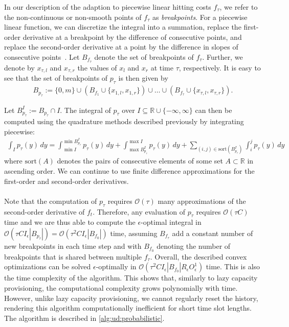In our description of the adaption to piecewise linear hitting costs $f_{\tau}$, we refer to the non-continuous or non-smooth points of $f_{\tau}$ as \emph{breakpoints}. For a piecewise linear function, we can discretize the integral into a summation, replace the first-order derivative at a breakpoint by the difference of consecutive points, and replace the second-order derivative at a point by the difference in slopes of consecutive points~\cite{Bansal2015}. Let $B_{f_{\tau}}$ denote the set of breakpoints of $f_{\tau}$. Further, we denote by $x_{\tau,l}$ and $x_{\tau,r}$ the values of $x_l$ and $x_r$ at time $\tau$, respectively. It is easy to see that the set of breakpoints of $p_{\tau}$ is then given by \begin{align*}
    B_{p_{\tau}} := \{0, m\} \cup \left(B_{f_1} \cup \{x_{1,l}, x_{1,r}\}\right) \cup \dots \cup \left(B_{f_{\tau}} \cup \{x_{\tau,l}, x_{\tau,r}\}\right).
\end{align*}

Let $B_{p_{\tau}}^I := B_{p_{\tau}} \cap I$. The integral of $p_{\tau}$ over $I \subseteq \mathbb{R} \cup \{-\infty, \infty\}$ can then be computed using the quadrature methods described previously by integrating piecewise: \begin{align*}
    \int_I p_{\tau}(y) \,dy = \int_{\min I}^{\min B_{p_{\tau}}^I} p_{\tau}(y) \,dy + \int_{\max B_{p_{\tau}}^I}^{\max I} p_{\tau}(y) \,dy + \sum_{(i, j) \in \text{sort}(B_{p_{\tau}}^I)} \int_i^j p_{\tau}(y) \,dy
\end{align*} where $\text{sort}(A)$ denotes the pairs of consecutive elements of some set $A \subset \mathbb{R}$ in ascending order. We can continue to use finite difference approximations for the first-order and second-order derivatives.

\paragraph{} Note that the computation of $p_{\tau}$ requires $\mathcal{O}(\tau)$ many approximations of the second-order derivative of $f_{t}$. Therefore, any evaluation of $p_{\tau}$ requires $\mathcal{O}(\tau C)$ time and we are thus able to compute the $\epsilon$-optimal integral in $\mathcal{O}(\tau C I_{\epsilon} |B_{p_{\tau}}|) = \mathcal{O}(\tau^2 C I_{\epsilon} |B_{f_0}|)$ time, assuming $B_{f_{\tau}}$ add a constant number of new breakpoints in each time step and with $B_{f_0}$ denoting the number of breakpoints that is shared between multiple $f_{\tau}$. Overall, the described convex optimizations can be solved $\epsilon$-optimally in $\mathcal{O}(\tau^2 C I_{\epsilon} |B_{f_0}| R_{\epsilon} O_{\epsilon}^1)$ time. This is also the time complexity of the algorithm. This shows that, similarly to lazy capacity provisioning, the computational complexity grows polynomially with time. However, unlike lazy capacity provisioning, we cannot regularly reset the history, rendering this algorithm computationally inefficient for short time slot lengths. The algorithm is described in \cref{alg:ud:probabilistic}.

